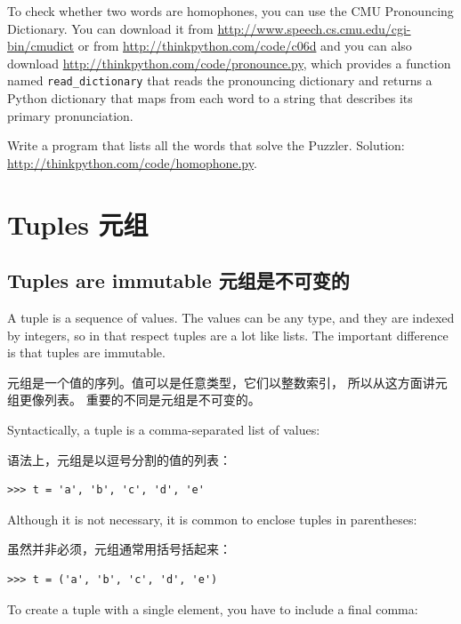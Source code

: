 \documentclass[10pt]{book}
\begin{document}
\begin{CJK}{UTF8}{gbsn}
\begin{exercise}
To check whether two words are homophones, you can use the CMU
Pronouncing Dictionary.  You can download it from
\url{http://www.speech.cs.cmu.edu/cgi-bin/cmudict} or from
\url{http://thinkpython.com/code/c06d} and you can also download
\url{http://thinkpython.com/code/pronounce.py}, which provides a function
named \verb"read_dictionary" that reads the pronouncing dictionary and
returns a Python dictionary that maps from each word to a string that
describes its primary pronunciation.

Write a program that lists all the words that solve the Puzzler.
Solution: \url{http://thinkpython.com/code/homophone.py}.

\end{exercise}



\chapter{Tuples 元组}
\label{tuplechap}

\section{Tuples are immutable 元组是不可变的}

A tuple is a sequence of values.  The values can be any type, and
they are indexed by integers, so in that respect tuples are a lot
like lists.  The important difference is that tuples are immutable.

元组是一个值的序列。值可以是任意类型，它们以整数索引，
所以从这方面讲元组更像列表。
重要的不同是元组是不可变的。

Syntactically, a tuple is a comma-separated list of values:

语法上，元组是以逗号分割的值的列表：

\begin{verbatim}
>>> t = 'a', 'b', 'c', 'd', 'e'
\end{verbatim}
%
Although it is not necessary, it is common to enclose tuples in
parentheses:

虽然并非必须，元组通常用括号括起来：

\begin{verbatim}
>>> t = ('a', 'b', 'c', 'd', 'e')
\end{verbatim}
%
To create a tuple with a single element, you have to include a final
comma:


\end{CJK}
\end{document}
